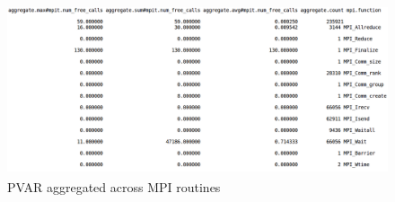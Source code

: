 \begin{center}
	\begin{figure}[tbp!]
         \centering
  \captionsetup{justification=centering}
		\includegraphics[scale=0.8, width=\columnwidth, height=5cm]{figures/CALIPER_MPI_counter_PVAR}
		\caption{PVAR aggregated across MPI routines}
		\label{fig:cali-counter}
	\end{figure}
\end{center}
